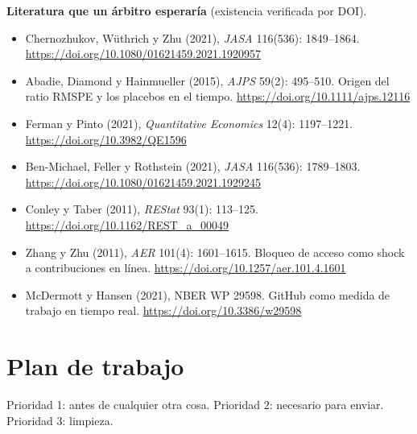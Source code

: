 \documentclass[11pt,a4paper]{article}
\begin{document}
\textbf{Literatura que un árbitro esperaría} (existencia verificada por DOI).
\begin{itemize}
\item Chernozhukov, Wüthrich y Zhu (2021), \emph{JASA} 116(536): 1849–1864.
\url{https://doi.org/10.1080/01621459.2021.1920957}
\item Abadie, Diamond y Hainmueller (2015), \emph{AJPS} 59(2): 495–510. Origen del ratio RMSPE y los
placebos en el tiempo. \url{https://doi.org/10.1111/ajps.12116}
\item Ferman y Pinto (2021), \emph{Quantitative Economics} 12(4): 1197–1221.
\url{https://doi.org/10.3982/QE1596}
\item Ben-Michael, Feller y Rothstein (2021), \emph{JASA} 116(536): 1789–1803.
\url{https://doi.org/10.1080/01621459.2021.1929245}
\item Conley y Taber (2011), \emph{REStat} 93(1): 113–125. \url{https://doi.org/10.1162/REST_a_00049}
\item Zhang y Zhu (2011), \emph{AER} 101(4): 1601–1615. Bloqueo de acceso como shock a contribuciones
en línea. \url{https://doi.org/10.1257/aer.101.4.1601}
\item McDermott y Hansen (2021), NBER WP 29598. GitHub como medida de trabajo en tiempo real.
\url{https://doi.org/10.3386/w29598}
\end{itemize}

\section{Plan de trabajo}

Prioridad 1: antes de cualquier otra cosa. Prioridad 2: necesario para enviar. Prioridad 3: limpieza.
\end{document}
